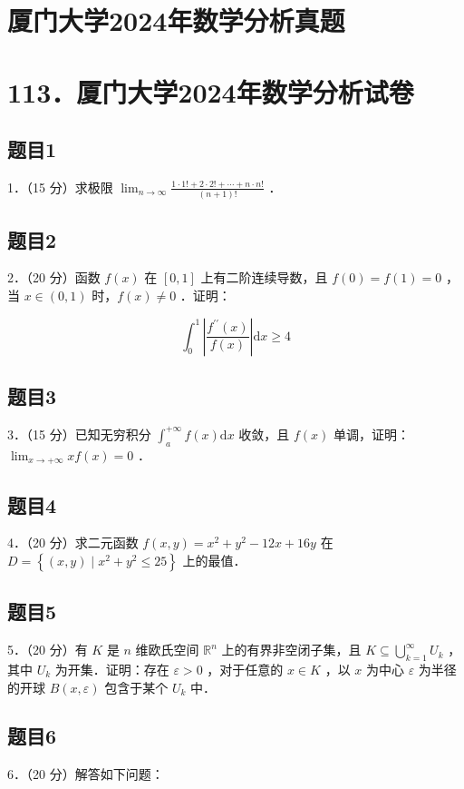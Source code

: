 \documentclass{article}
\begin{document}
\section*{厦门大学2024年数学分析真题}
\section*{113．厦门大学2024年数学分析试卷}

\subsection{题目1}
1．（15 分）求极限 \(\lim _{n \rightarrow \infty} \frac{1 \cdot 1!+2 \cdot 2!+\cdots+n \cdot n!}{(n+1)!}\) ．

\subsection{题目2}
2．（20 分）函数 \(f(x)\) 在 \([0,1]\) 上有二阶连续导数，且 \(f(0)=f(1)=0\) ，当 \(x \in(0,1)\) 时，\(f(x) \neq 0\) ．证明：

\[
\int_{0}^{1}\left|\frac{f^{\prime \prime}(x)}{f(x)}\right| \mathrm{d} x \geq 4
\]

\subsection{题目3}
3．（15 分）已知无穷积分 \(\int_{a}^{+\infty} f(x) \mathrm{d} x\) 收敛，且 \(f(x)\) 单调，证明： \(\lim _{x \rightarrow+\infty} x f(x)=0\) ．

\subsection{题目4}
4．（20 分）求二元函数 \(f(x, y)=x^{2}+y^{2}-12 x+16 y\) 在 \(D=\left\{(x, y) \mid x^{2}+y^{2} \leq 25\right\}\) 上的最值．

\subsection{题目5}
5．（20 分）有 \(K\) 是 \(n\) 维欧氏空间 \(\mathbb{R}^{n}\) 上的有界非空闭子集，且 \(K \subseteq \bigcup_{k=1}^{\infty} U_{k}\) ，其中 \(U_{k}\) 为开集．证明：存在 \(\varepsilon>0\) ，对于任意的 \(x \in K\) ，以 \(x\) 为中心 \(\varepsilon\) 为半径的开球 \(B(x, \varepsilon)\) 包含于某个 \(U_{k}\) 中．

\subsection{题目6}
6．（20 分）解答如下问题：
\end{document}
